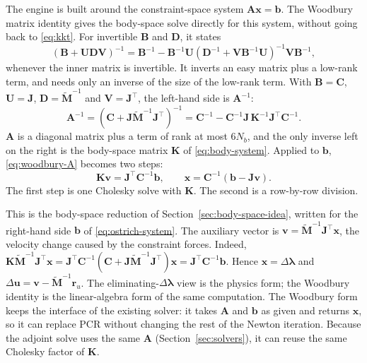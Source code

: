 The engine is built around the constraint-space system
$\mathbf{A}\mathbf{x} = \mathbf{b}$. The Woodbury matrix identity
\citep{woodbury1950inverting,golub2013matrix} gives the body-space solve
directly for this system, without going back to \eqref{eq:kkt}. For
invertible $\mathbf{B}$ and $\mathbf{D}$, it states
\begin{equation}
  \left(\mathbf{B} + \mathbf{U}\mathbf{D}\mathbf{V}\right)^{-1}
  = \mathbf{B}^{-1} - \mathbf{B}^{-1}\mathbf{U}
    \left(\mathbf{D}^{-1} + \mathbf{V}\mathbf{B}^{-1}\mathbf{U}\right)^{-1}
    \mathbf{V}\mathbf{B}^{-1} ,
\end{equation}
whenever the inner matrix is invertible. It inverts an easy matrix plus a
low-rank term, and needs only an inverse of the size of the low-rank term.
With $\mathbf{B} = \mathbf{C}$, $\mathbf{U} = \mathbf{J}$,
$\mathbf{D} = \tilde{\mathbf{M}}^{-1}$ and $\mathbf{V} = \mathbf{J}^\top$,
the left-hand side is $\mathbf{A}^{-1}$:
\begin{equation}
  \mathbf{A}^{-1}
  = \left(\mathbf{C} + \mathbf{J}\tilde{\mathbf{M}}^{-1}\mathbf{J}^\top\right)^{-1}
  = \mathbf{C}^{-1} - \mathbf{C}^{-1}\mathbf{J}\,\mathbf{K}^{-1}\mathbf{J}^\top\mathbf{C}^{-1} .
  \label{eq:woodbury-A}
\end{equation}
$\mathbf{A}$ is a diagonal matrix plus a term of rank at most $6N_b$, and
the only inverse left on the right is the body-space matrix $\mathbf{K}$ of
\eqref{eq:body-system}. Applied to $\mathbf{b}$, \eqref{eq:woodbury-A}
becomes two steps:
\begin{equation}
  \mathbf{K}\mathbf{v} = \mathbf{J}^\top\mathbf{C}^{-1}\mathbf{b},
  \qquad
  \mathbf{x} = \mathbf{C}^{-1}\left(\mathbf{b} - \mathbf{J}\mathbf{v}\right) .
  \label{eq:woodbury-solve}
\end{equation}
The first step is one Cholesky solve with $\mathbf{K}$. The second is a
row-by-row division.

This is the body-space reduction of Section~\ref{sec:body-space-idea},
written for the right-hand side $\mathbf{b}$ of \eqref{eq:ostrich-system}.
The auxiliary vector is $\mathbf{v} = \tilde{\mathbf{M}}^{-1}\mathbf{J}^\top\mathbf{x}$,
the velocity change caused by the constraint forces. Indeed,
$\mathbf{K}\tilde{\mathbf{M}}^{-1}\mathbf{J}^\top\mathbf{x}
= \mathbf{J}^\top\mathbf{C}^{-1}(\mathbf{C} + \mathbf{J}\tilde{\mathbf{M}}^{-1}\mathbf{J}^\top)\mathbf{x}
= \mathbf{J}^\top\mathbf{C}^{-1}\mathbf{b}$.
Hence $\mathbf{x} = \Delta\boldsymbol{\lambda}$ and
$\Delta\mathbf{u} = \mathbf{v} - \tilde{\mathbf{M}}^{-1}\mathbf{r}_u$.
The eliminating-$\Delta\boldsymbol{\lambda}$ view is the physics form; the
Woodbury identity is the linear-algebra form of the same computation. The
Woodbury form keeps the interface of the existing solver: it takes
$\mathbf{A}$ and $\mathbf{b}$ as given and returns $\mathbf{x}$, so it can
replace PCR without changing the rest of the Newton iteration. Because the
adjoint solve uses the same $\mathbf{A}$ (Section~\ref{sec:solvers}), it can
reuse the same Cholesky factor of $\mathbf{K}$.

